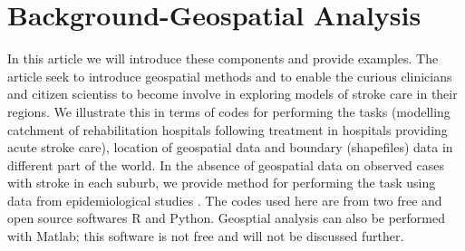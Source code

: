\documentclass[utf8]{frontiersHLTH}
\begin{document}




\section{Background-Geospatial Analysis}\label{background}

In this article we will introduce these components and provide examples. The article seek to introduce geospatial methods and to enable the curious clinicians and citizen scientiss to become involve in exploring models of stroke care in their regions. We illustrate this in terms of codes for performing the tasks (modelling catchment of rehabilitation hospitals following treatment in hospitals providing acute stroke care), location of geospatial data and boundary (shapefiles) data in different part of the world. In the absence of geospatial data on observed cases with stroke in each suburb, we provide method for performing the task using data from epidemiological studies \cite{Phan_2017}. The codes used here are from two free and open source softwares R and Python. Geosptial analysis can also be performed with Matlab\cite{Milne_2017}; this software is not free and will not be discussed further. 
\end{document}

